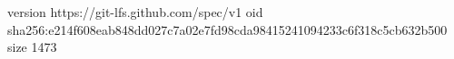 version https://git-lfs.github.com/spec/v1
oid sha256:e214f608eab848dd027c7a02e7fd98cda98415241094233c6f318c5cb632b500
size 1473
